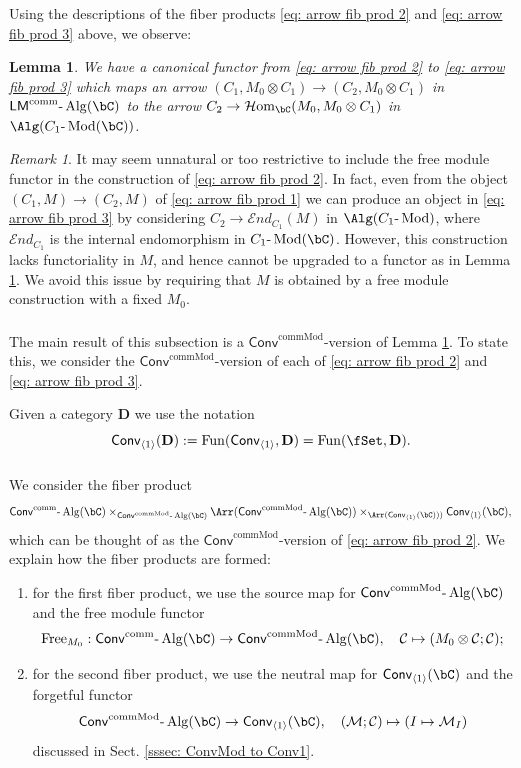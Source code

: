\documentclass[10pt]{amsart}
\newcommand{\sssec}{\subsubsection}
\newtheorem{lemma}[subsubsection]{Lemma}
\theoremstyle{remark}
\newtheorem{rmk}[subsubsection]{Remark}
\newcommand{\on}{\operatorname}
\newcommand{\cC}{\mathcal{C}}
\newcommand{\cM}{\mathcal{M}}
\newcommand{\lMod}{\text{-}\on{Mod}}
\newcommand{\lAlg}{\text{-}\on{Alg}}
\DeclareMathOperator{\cHom}{\mathcal{H}om}
\newcommand{\Fun}{\on{Fun}}
\newcommand{\bD}{\mathbf{D}}
\newcommand{\Conv}{\mathsf{Conv}}
\newcommand{\Convcomm}{\mathsf{Conv}^{\on{comm}}}
\newcommand{\ConvcMod}{\mathsf{Conv}^{\on{commMod}}}
\newcommand{\LMcomm}{\mathsf{LM}^{\on{comm}}}
\begin{document}
\sssec{}
Using the descriptions of the fiber products \eqref{eq: arrow fib prod 2} and \eqref{eq: arrow fib prod 3} above, we observe:

\begin{lemma}\label{lem: functor btw arrow fib prods}
    We have a canonical functor from \eqref{eq: arrow fib prod 2} to \eqref{eq: arrow fib prod 3} which maps an arrow $(C_1,M_0\otimes C_1)\rightarrow (C_2,M_0\otimes C_1)$ in $\LMcomm\lAlg(\bC)$ to the arrow $C_2\rightarrow \cHom_{\bC}(M_0, M_0\otimes C_1)$ in $\Alg(C_1\lMod(\bC))$.
\end{lemma}

\begin{rmk}
    It may seem unnatural or too restrictive to include the free module functor in the construction of \eqref{eq: arrow fib prod 2}. In fact, even from the object $(C_1,M)\rightarrow (C_2,M)$ of \eqref{eq: arrow fib prod 1} we can produce an object in \eqref{eq: arrow fib prod 3} by considering $C_2\rightarrow \mathcal{E}nd_{C_1}(M)$ in $\Alg(C_1\lMod)$, where $\mathcal{E}nd_{C_1}$ is the internal endomorphism in $C_1\lMod(\bC)$. However, this construction lacks functoriality in $M$, and hence cannot be upgraded to a functor as in Lemma \ref{lem: functor btw arrow fib prods}. We avoid this issue by requiring that $M$ is obtained by a free module construction with a fixed $M_0$.
\end{rmk}

\sssec{}
The main result of this subsection is a $\ConvcMod$-version of Lemma \ref{lem: functor btw arrow fib prods}. To state this, we consider the $\ConvcMod$-version of each of \eqref{eq: arrow fib prod 2} and \eqref{eq: arrow fib prod 3}.
\medskip

Given a category $\bD$ we use the notation
\[\Conv_{\langle 1\rangle}(\bD):=\Fun(\Conv_{\langle 1\rangle},\bD)=\Fun(\fSet,\bD).\]


\sssec{}\label{sssec: construction fib prod 1}
We consider the fiber product
\begin{equation}\label{eq: ConvMod fib prod 1}
    \Convcomm\lAlg(\bC)\times_{\ConvcMod\lAlg(\bC)} \Arr(\ConvcMod\lAlg(\bC))\times_{\Arr(\Conv_{\langle 1\rangle}(\bC)))} \Conv_{\langle 1\rangle}(\bC),
\end{equation}
which can be thought of as the $\ConvcMod$-version of \eqref{eq: arrow fib prod 2}. We explain how the fiber products are formed:
\begin{enumerate}
    \item for the first fiber product, we use the source map for $\ConvcMod\lAlg(\bC)$ and the free module functor
    \[\on{Free}_{M_0}: \Convcomm\lAlg(\bC)\rightarrow \ConvcMod\lAlg(\bC),\quad \cC\mapsto (M_0\otimes \cC;\cC);\]
    \item for the second fiber product, we use the neutral map for $\Conv_{\langle 1\rangle}(\bC)$ and the forgetful functor
    \begin{equation}\label{eq: forget to module}
        \ConvcMod\lAlg(\bC)\rightarrow \Conv_{\langle 1\rangle}(\bC),\quad (\cM;\cC)\mapsto (I\mapsto \cM_I)
    \end{equation}
    discussed in Sect. \ref{sssec: ConvMod to Conv1}.
\end{enumerate}
\end{document}
